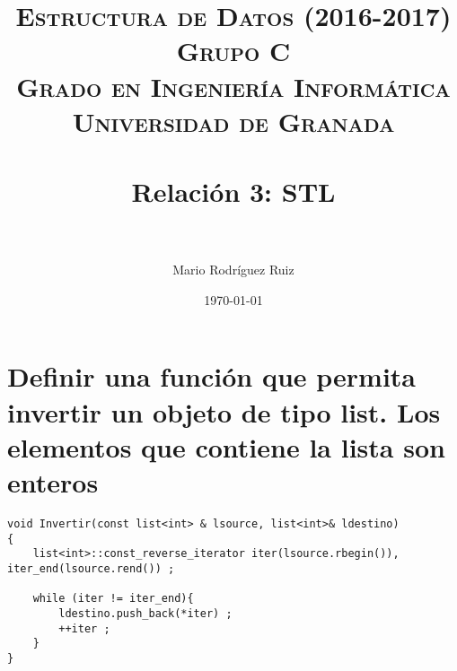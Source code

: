 


\title{	
\normalfont \normalsize 
\textsc{\textbf{Estructura de Datos (2016-2017)} \\ Grupo C \\ Grado en Ingeniería Informática\\ Universidad de Granada} \\ [25pt] %
\horrule{0.5pt} \\[0.4cm] %
\huge Relación 3: STL \\ %
\horrule{2pt} \\[0.5cm] %
}

\author{Mario Rodríguez Ruiz} %

\date{\normalsize\today} %




\maketitle %

\newpage %

\tableofcontents %

\newpage

\section{Definir una función que permita invertir un objeto de tipo list. Los elementos que contiene la lista son
	enteros}
\begin{lstlisting}[style=cmas]
void Invertir(const list<int> & lsource, list<int>& ldestino)
{
	list<int>::const_reverse_iterator iter(lsource.rbegin()), iter_end(lsource.rend()) ;
	
	while (iter != iter_end){
		ldestino.push_back(*iter) ;
		++iter ;
	}
}		
\end{lstlisting}

